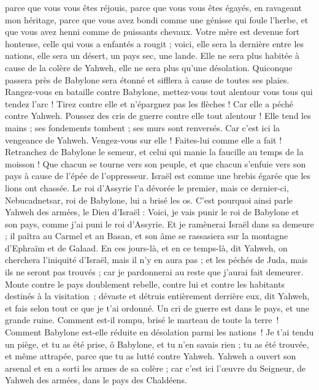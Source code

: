 \begin{multicols}{2}
parce que vous vous êtes réjouis, parce que vous vous êtes égayés, en ravageant mon héritage, parce que vous avez bondi comme une génisse qui foule l’herbe, et que vous avez henni comme de puissants chevaux.
Votre mère est devenue fort honteuse, celle qui vous a enfantés a rougit ; voici, elle sera la dernière entre les nations, elle sera un désert, un pays sec, une lande.
Elle ne sera plus habitée à cause de la colère de Yahweh, elle ne sera plus qu'une désolation. Quiconque passera près de Babylone sera étonné et sifflera à cause de toutes ses plaies.
Rangez-vous en bataille contre Babylone, mettez-vous tout alentour vous tous qui tendez l'arc ! Tirez contre elle et n'épargnez pas les flèches ! Car elle a péché contre Yahweh.
Poussez des cris de guerre contre elle tout alentour ! Elle tend les mains ; ses fondements tombent ; ses murs sont renversés. Car c'est ici la vengeance de Yahweh. Vengez-vous sur elle ! Faites-lui comme elle a fait !
Retranchez de Babylone le semeur, et celui qui manie la faucille au temps de la moisson ! Que chacun se tourne vers son peuple, et que chacun s'enfuie vers son pays à cause de l'épée de l'oppresseur.
Israël est comme une brebis égarée que les lions ont chassée. Le roi d'Assyrie l'a dévorée le premier, mais ce dernier-ci, Nebucadnetsar, roi de Babylone, lui a brisé les os.
C'est pourquoi ainsi parle Yahweh des armées, le Dieu d'Israël : Voici, je vais punir le roi de Babylone et son pays, comme j'ai puni le roi d'Assyrie.
Et je ramènerai Israël dans sa demeure ; il paîtra au Carmel et au Basan, et son âme se rassasiera sur la montagne d'Ephraïm et de Galaad.
En ces jours-là, et en ce temps-là, dit Yahweh, on cherchera l'iniquité d'Israël, mais il n'y en aura pas ; et les péchés de Juda, mais ils ne seront pas trouvés ; car je pardonnerai au reste que j'aurai fait demeurer.
Monte contre le pays doublement rebelle, contre lui et contre les habitants destinés à la visitation ; dévaste et détruis entièrement derrière eux, dit Yahweh, et fais selon tout ce que je t’ai ordonné.
Un cri de guerre est dans le pays, et une grande ruine.
Comment est-il rompu, brisé le marteau de toute la terre ! Comment Babylone est-elle réduite en désolation parmi les nations !
Je t'ai tendu un piège, et tu as été prise, ô Babylone, et tu n'en savais rien ; tu as été trouvée, et même attrapée, parce que tu as lutté contre Yahweh.
Yahweh a ouvert son arsenal et en a sorti les armes de sa colère ; car c'est ici l'œuvre du Seigneur, de Yahweh des armées, dans le pays des Chaldéens.

\end{multicols}

